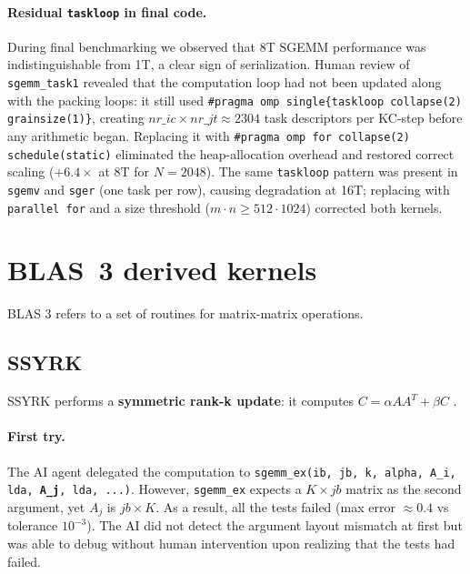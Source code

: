 \documentclass[11pt,a4paper]{article}
\begin{document}
\paragraph{Residual \texttt{taskloop} in final code.}
During final benchmarking we observed that 8T SGEMM performance was indistinguishable
from 1T, a clear sign of serialization. Human review of \texttt{sgemm\_task1} revealed
that the computation loop had not been updated along with the packing loops: it still
used \texttt{\#pragma omp single\{taskloop collapse(2) grainsize(1)\}}, creating
$nr\_ic \times nr\_jt \approx 2304$ task descriptors per KC-step before any arithmetic
began. Replacing it with \texttt{\#pragma omp for collapse(2) schedule(static)}
eliminated the heap-allocation overhead and restored correct scaling
($+6.4\times$ at 8T for $N=2048$). The same \texttt{taskloop} pattern was present in
\texttt{sgemv} and \texttt{sger} (one task per row), causing degradation at 16T;
replacing with \texttt{parallel for} and a size threshold
($m \cdot n \ge 512 \cdot 1024$) corrected both kernels.

\section{BLAS~3 derived kernels}

BLAS 3 refers to a set of routines for matrix-matrix operations.

\subsection{SSYRK}

SSYRK performs a \textbf{symmetric rank-k update}: it computes $C = \alpha AA^T + \beta C$ .

\paragraph{First try.}
The AI agent delegated the computation to \texttt{sgemm\_ex(ib, jb, k, alpha, A\_i, lda,
\textbf{A\_j}, lda, ...)}. However, \texttt{sgemm\_ex} expects a
$K\times jb$ matrix as the second argument, yet $A_j$ is $jb\times K$.
As a result, all the tests failed (max error $\approx 0.4$ vs tolerance $10^{-3}$). The AI did not detect the argument layout mismatch at first but was able to debug without human intervention upon realizing that the tests had failed.
\end{document}
